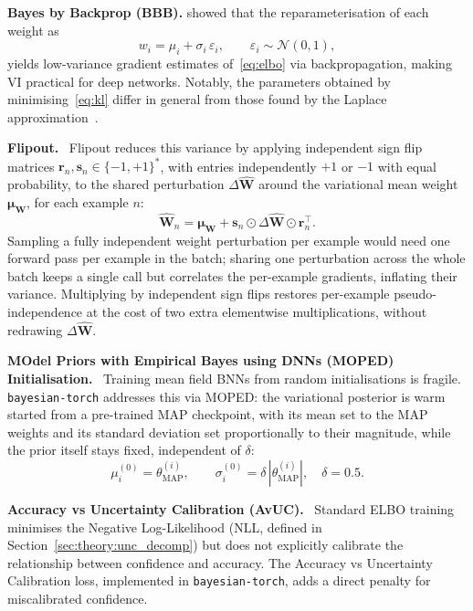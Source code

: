\documentclass[conference]{IEEEtran}
\newcommand{\cN}{\mathcal{N}}
\newcommand{\MAP}{\text{MAP}}
\begin{document}
\textbf{Bayes by Backprop (BBB).} \citet{blundell2015weight} showed that the
reparameterisation of each weight as
\begin{equation}
    w_i = \mu_i + \sigma_i\,\varepsilon_i, \qquad \varepsilon_i\sim\cN(0,1),
\end{equation}
yields low-variance gradient estimates of~\eqref{eq:elbo} via backpropagation, making VI
practical for deep networks. Notably, the parameters obtained by minimising~\eqref{eq:kl}
differ in general from those found by the Laplace approximation~\citep{murphy2023pml}.

\textbf{Flipout.}~\citep{wen2018flipout} Flipout reduces this variance by applying
independent sign flip matrices $\mathbf{r}_n,\mathbf{s}_n\in\{-1,+1\}^*$, with entries
independently $+1$ or $-1$ with equal probability, to the shared
perturbation
$\Delta\hat{\mathbf{W}}$ around the variational mean weight $\boldsymbol{\mu}_{\mathbf{W}}$,
for each example $n$:
\begin{equation}
	\hat{\mathbf{W}}_n
	= \boldsymbol{\mu}_{\mathbf{W}} + \mathbf{s}_n \odot \Delta\hat{\mathbf{W}}
	\odot \mathbf{r}_n^{\!\top}.
\end{equation}
Sampling a fully independent weight perturbation per example would need one forward pass
per example in the batch; sharing one perturbation across the whole batch keeps a single
call but correlates the per-example gradients, inflating their variance. Multiplying by
independent sign flips restores per-example pseudo-independence at the cost of two extra
elementwise multiplications, without redrawing $\Delta\hat{\mathbf{W}}$.

\textbf{MOdel Priors with Empirical Bayes using DNNs (MOPED)
Initialisation.}~\citep{krishnan2020specifying} Training mean field BNNs from random
initialisations is fragile. \texttt{bayesian-torch} addresses this via MOPED: the
variational posterior is warm started from a pre-trained MAP checkpoint, with its mean
set to the MAP weights and its standard deviation set proportionally to their magnitude,
while the prior itself stays fixed, independent of $\delta$:
\begin{equation}
	\mu_i^{(0)} = \theta_{\MAP}^{(i)}, \qquad
	\sigma_i^{(0)} = \delta\,|\theta_{\MAP}^{(i)}|, \quad \delta=0.5.
\end{equation}

\textbf{Accuracy vs Uncertainty Calibration (AvUC).}~\citep{krishnan2020avuc} Standard ELBO
training minimises the Negative Log-Likelihood (NLL, defined in
Section~\ref{sec:theory:unc_decomp}) but does not explicitly calibrate the relationship
between confidence and accuracy. The Accuracy vs Uncertainty Calibration loss, implemented
in
\texttt{bayesian-torch}, adds a direct penalty for
miscalibrated confidence.
\end{document}
